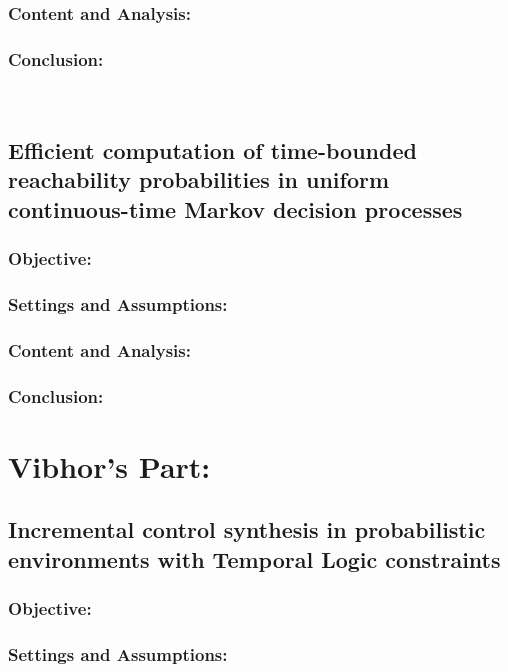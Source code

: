 \documentclass{article}
\begin{document}
\subsubsection{Content and Analysis:}

\subsubsection{Conclusion:}

\\
\subsection{Efficient
computation of time-bounded reachability probabilities in uniform
continuous-time Markov decision processes}
\subsubsection{Objective:}

\subsubsection{Settings and Assumptions:}

\subsubsection{Content and Analysis:}

\subsubsection{Conclusion:}


\section{Vibhor's Part:}
\subsection{ Incremental control synthesis in probabilistic environments with Temporal Logic constraints}
\subsubsection{Objective:}

\subsubsection{Settings and Assumptions:}
\end{document}
